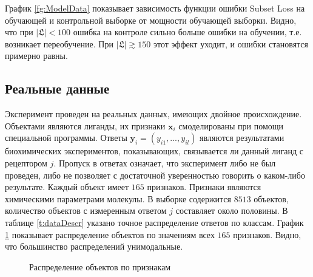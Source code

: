 \documentclass[12pt,twoside]{article}
\newcommand{\x}{\mathbf{x}}
\newcommand{\y}{\mathbf{y}}
\begin{document}
График \ref{fg:ModelData} показывает зависимость функции ошибки Subset Loss на обучающей и контрольной выборке от мощности обучающей выборки. Видно, что при $|\mathfrak{L}|<100$ ошибка на контроле сильно больше ошибки на обучении, т.е. возникает переобучение. При $|\mathfrak{L}|\gtrsim 150$ этот эффект уходит, и ошибки становятся примерно равны.

\subsection{Реальные данные}
Эксперимент проведен на реальных данных, имеющих двойное происхождение. Объектами являются лиганды, их признаки $\x_i$ смоделированы при помощи специальной программы. Ответы $\y_i=(y_{i1},...,y_{il})$ являются результатами биохимических экспериментов, показывающих, связывается ли данный лиганд с рецептором $j$. Пропуск в ответах означает, что эксперимент либо не был проведен, либо не позволяет с достаточной уверенностью говорить о каком-либо результате. Каждый объект имеет $165$ признаков. Признаки являются химическими параметрами молекулы. В выборке содержится $8513$ объектов, количество объектов с измеренным ответом $j$ составляет около половины. В таблице \ref{t:dataDescr} указано точное распределение ответов по классам. График \ref{fg:realFeatures} показывает распределение объектов по значениям всех $165$ признаков. Видно, что большинство распределений унимодальные.

\begin{figure}[H]
	\caption{Распределение объектов по признакам}
	\label{fg:realFeatures}
\end{figure}
\end{document}
